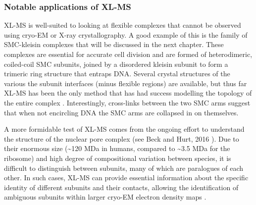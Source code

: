 \documentclass[a4paper,11pt,twoside,openright]{scrbook}
\begin{document}

\subsubsection{Notable applications of XL-MS}
XL-MS is well-suited to looking at flexible complexes that cannot be observed using cryo-EM or X-ray crystallography. A good example of this is the family of SMC-kleisin complexes that will be discussed in the next chapter. These complexes are essential for accurate cell division and are formed of heterodimeric, coiled-coil SMC subunits, joined by a disordered kleisin subunit to form a trimeric ring structure that entraps DNA. Several crystal structures of the various the subunit interfaces (minus flexible regions) are available, but thus far XL-MS has been the only method that has had success modelling the topology of the entire complex \cite{Barysz2015}. Interestingly, cross-links between the two SMC arms suggest that when not encircling DNA the SMC arms are collapsed in on themselves.

A more formidable test of XL-MS comes from the ongoing effort to understand the structure of the nuclear pore complex (see Beck and Hurt, 2016 \cite{Beck2016}). Due to their enormous size (\textasciitilde 120 MDa in humans, compared to \textasciitilde 3.5 MDa for the ribosome) and high degree of compositional variation between species, it is difficult to distinguish between subunits, many of which are paralogues of each other. In such cases, XL-MS can provide essential information about the specific identity of different subunits and their contacts, allowing the identification of ambiguous subunits within larger cryo-EM electron density maps \cite{Bui2013,Shi2014a}.

\end{document}
